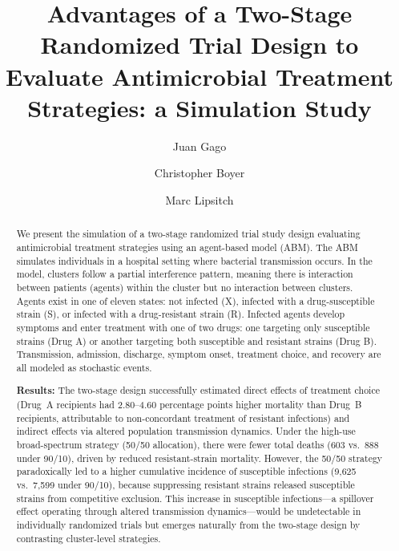 \documentclass[preprint,11pt]{elsarticle}
\begin{document}
\begin{frontmatter}

\title{Advantages of a Two-Stage Randomized Trial Design to Evaluate Antimicrobial Treatment Strategies: a Simulation Study}

\author[harvard]{Juan Gago}
\author[harvard,cwru,ccf]{Christopher Boyer}
\author[harvard]{Marc Lipsitch}


\address[harvard]{Department of Epidemiology, Harvard T.H. Chan School of Public Health, Boston, MA, USA}
\address[cwru]{Department of Medicine, Case Western Reserve School of Medicine, Cleveland, OH, USA}
\address[ccf]{Department of Quantitative Health Sciences, Cleveland Clinic, Cleveland, OH, USA}

\begin{abstract}
We present the simulation of a two-stage randomized trial study design evaluating antimicrobial treatment strategies using an agent-based model (ABM). The ABM simulates individuals in a hospital setting where bacterial transmission occurs. In the model, clusters follow a partial interference pattern, meaning there is interaction between patients (agents) within the cluster but no interaction between clusters. Agents exist in one of eleven states: not infected (X), infected with a drug-susceptible strain (S), or infected with a drug-resistant strain (R). Infected agents develop symptoms and enter treatment with one of two drugs: one targeting only susceptible strains (Drug A) or another targeting both susceptible and resistant strains (Drug B). Transmission, admission, discharge, symptom onset, treatment choice, and recovery are all modeled as stochastic events.

\textbf{Results:} The two-stage design successfully estimated direct effects of treatment choice (Drug~A recipients had 2.80--4.60 percentage points higher mortality than Drug~B recipients, attributable to non-concordant treatment of resistant infections) and indirect effects via altered population transmission dynamics. Under the high-use broad-spectrum strategy (50/50 allocation), there were fewer total deaths (603 vs.\ 888 under 90/10), driven by reduced resistant-strain mortality. However, the 50/50 strategy paradoxically led to a higher cumulative incidence of susceptible infections (9,625 vs.\ 7,599 under 90/10), because suppressing resistant strains released susceptible strains from competitive exclusion. This increase in susceptible infections---a spillover effect operating through altered transmission dynamics---would be undetectable in individually randomized trials but emerges naturally from the two-stage design by contrasting cluster-level strategies.


\end{abstract}
\end{frontmatter}
\end{document}
